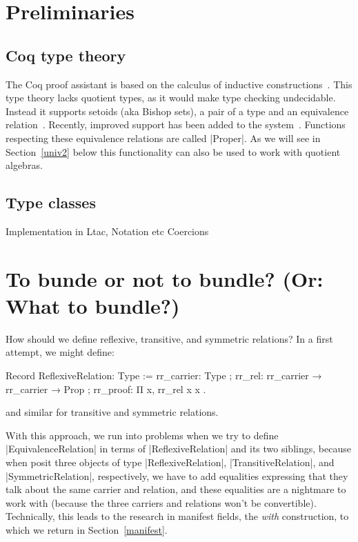 \documentclass[a4paper,10pt, runningheads]{llncs}
\begin{document}
\section{Preliminaries}
\subsection{Coq type theory}
The Coq proof assistant is based on the calculus of inductive
constructions~\cite{CoquandHuet,CoquandPaulin}.
This type theory lacks quotient types, as it would make type checking undecidable. Instead it
supports setoids (aka Bishop sets), a pair of a type and an equivalence
relation~\cite{Bishop67,Hofmann,Capretta}. Recently, improved support has been added to the
system~\cite{Setoid-rewrite}. Functions respecting these equivalence relations are called |Proper|.
As we will see in Section~\ref{univ2} below this functionality can also be used to work with
quotient algebras.

\subsection{Type classes}
Implementation in Ltac, Notation etc
Coercions


\section{To bunde or not to bundle? (Or: What to bundle?)}

How should we define reflexive, transitive, and symmetric relations? In a first attempt, we
might define:
\begin{code}
  Record ReflexiveRelation: Type :=
    { rr_carrier: Type
    ; rr_rel: rr_carrier → rr_carrier → Prop
    ; rr_proof: Π x, rr_rel x x }.
\end{code}
and similar for transitive and symmetric relations.

With this approach, we run into problems when we try to define |EquivalenceRelation| in terms of
|ReflexiveRelation| and its two siblings, because when posit three objects of type
|ReflexiveRelation|, |TransitiveRelation|, and |SymmetricRelation|, respectively, we have to
add equalities expressing that they talk about the same carrier and relation, and these equalities
are a nightmare to work with (because the three carriers and relations won't be convertible).
Technically, this leads to the research in manifest fields, the \emph{with} construction, to which
we return in Section~\ref{manifest}.
\end{document}
